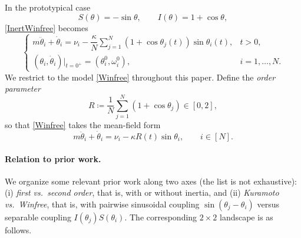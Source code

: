 \documentclass[11pt,reqno]{amsart}
\theoremstyle{definition}
\theoremstyle{remark}
\begin{document}
In the prototypical case
\begin{equation}\label{standard}
    S(\theta)=-\sin\theta,\qquad I(\theta)=1+\cos\theta,
\end{equation}
\eqref{InertWinfree} becomes
\begin{equation}\label{Winfree}
    \begin{cases}
        m\ddot\theta_i + \dot{\theta}_i=\nu_i-\dfrac\kappa N \sum_{j=1}^N (1+\cos\theta_j(t))\sin\theta_i(t), & t>0, \\[2pt]
        (\theta_i,\dot\theta_i)\big\rvert_{t=0^+} =(\theta_i^0,\omega_i^0), & i=1,\dots,N.
    \end{cases}
\end{equation}
We restrict to the model \eqref{Winfree} throughout this paper. Define the
\emph{order parameter}
\begin{equation}\label{order_parameter}
R\coloneqq\frac1N\sum_{j=1}^N(1+\cos\theta_j)\in[0,2],
\end{equation}
so that \eqref{Winfree} takes the mean-field form
\begin{equation}\label{Winfree_orderparam}
    m\ddot\theta_i+\dot{\theta}_i=\nu_i-\kappa R(t)\sin\theta_i,\qquad i\in[N].
\end{equation}

\paragraph{{\bf Relation to prior work.}}
We organize some relevant prior work along two axes (the list is not exhaustive): (i) \emph{first vs.\ second order}, that is, with or without
inertia, and (ii) \emph{Kuramoto vs.\ Winfree}, that is, with pairwise
sinusoidal coupling $\sin(\theta_j-\theta_i)$ versus separable coupling
$I(\theta_j)S(\theta_i)$. The corresponding
$2\times 2$ landscape is as follows.
\end{document}
